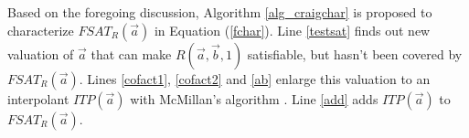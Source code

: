 \documentclass[runningheads,a4paper,orivec]{llncs}
\begin{document}
Based on the foregoing discussion,
Algorithm \ref{alg_craigchar} is proposed to characterize $FSAT_R(\vec{a})$ in Equation (\ref{fchar}).
Line \ref{testsat} finds out new valuation of $\vec{a}$ that can make $R(\vec{a},\vec{b},1)$ satisfiable,
but hasn't been covered by $FSAT_R(\vec{a})$.
Lines \ref{cofact1}, \ref{cofact2} and \ref{ab} enlarge this valuation 
to an interpolant $ITP(\vec{a})$ with McMillan's algorithm \cite{interp_McMillan}.
Line \ref{add} adds $ITP(\vec{a})$ to $FSAT_R(\vec{a})$.
% 


% 
% 



% 
% 
\end{document}
